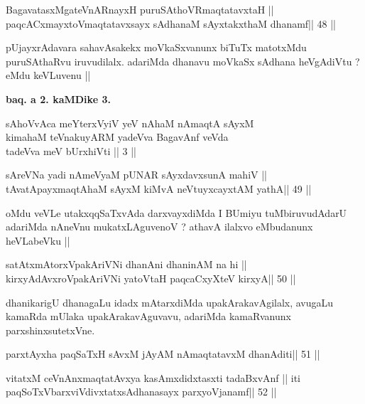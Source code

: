 \begin{shl}
BagavatasxMgateVnARnayxH puruSAthoVR\s maqtatavxtaH ||
paqcACxmayxtoV\s maqtatavxsayx sAdhanaM sAyxtakxthaM dhanamf\hfill || 48 ||
\end{shl}

\begin{artha}
pUjayxrAdavara sahavAsakekx moVkaSxvanunx biTuTx matotxMdu puruSAthaRvu
iruvudilalx. adariMda dhanavu moVkaSx sAdhana heVgAdiVtu ? eMdu
keVLuvenu ||
\end{artha}

\begin{center}
\textbf{baq. a 2. kaMDike 3.}
\end{center}

\begin{shl}
sAhoVvAca meYterxVyiV yeV nAhaM nAmaqtA sAyxM\\
kimahaM teVnakuyARM yadeVva BagavAnf veVda\\
tadeVva meV bUrxhiVti || 3 ||
\end{shl}

\begin{shl}
sAreVNa yadi nAmeVyaM pUNAR sAyxdavxsunA mahiV ||
tAvatA\s payxmaqtA\s haM sAyxM kiMvA neVtuyxcayxtAM yathA\hfill || 49 ||
\end{shl}

\begin{artha}
oMdu veVLe utakxqqSaTxvAda darxvayxdiMda I BUmiyu tuMbiruvudAdarU
adariMda nAneVnu mukatxLAguvenoV ? athavA ilalxvo eMbudanunx
heVLabeVku ||
\end{artha}

\begin{shl}
satAtxmAtorxVpakAriVNi dhanAni dhaninAM na hi ||
kirxyAdAvxroVpakAriVNi yatoV\s taH paqcaCxyXteV kirxyA\hfill || 50 ||
\end{shl}

\begin{artha}
dhanikarigU dhanagaLu idadx mAtarxdiMda upakArakavAgilalx, avugaLu
kamaRda mUlaka upakArakavAguvavu, adariMda kamaRvanunx
parxshinxsutetxVne.
\end{artha}


\begin{shl}
parxtAyxha paqSaTxH sAvxM jAyAM nAmaqtatavxM dhanAditi\hfill || 51 ||
\end{shl}

\begin{shl}
vitatxM ceVnAnxmaqtatAvxya kasAmxdidxtasxti tadaBxvAnf ||
iti paqSoTxV\s barxviVdivxtatxsAdhanasayx parxyoVjanamf\hfill || 52 ||
\end{shl}

